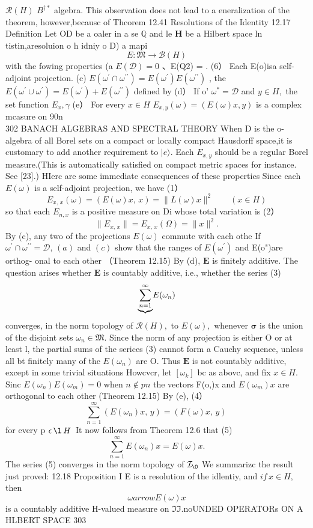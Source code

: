 ${\mathcal{R}}(H)$ $B^{\dagger*}$ algebra. This observation does not lead to a eneralization of the theorem, however,becausc of Thcorem 12.41 Resolutions of the Identity 12.17 Definition Let OD be a oaler in a se $\mathbb{Q}$ and le ${\boldsymbol{H}}$ be a Hilbert space ln tistin,aresoluion o h idniy o D) a mapi $$ E\colon\mathfrak{M}\to{\mathcal{B}}(H) $$ with the fowing properties (a $E({\mathcal{D}})=0$ 、E(Q2) = . (6） Each E(o)isa self-adjoint projection. (c) $E(\omega^{\prime}\cap\omega^{\prime\prime})=E(\omega^{\prime})E(\omega^{\prime\prime})$ , the $E(\omega^{\prime}\cup\omega^{\prime})=E(\omega^{\prime})+E(\omega^{\prime\prime})$ defined by (d） If o' $\omega^{*}={\mathcal{D}}$ and $y\in H,$ the set function $\scriptstyle{E_{x},\gamma}$ (e） For every $x\in H$ $E_{x,y}(\omega)=(E(\omega)x,y)$ is a complex mcasure on 90n$$ \qquad\qquad\qquad\qquad\qquad\qquad\qquad\qquad\qquad\qquad\qquad\qquad\qquad\qquad\qquad\qquad\qquad\qquad\qquad $$ 302 BANACH ALGEBRAS AND SPECTRAL THEORY When D is the o-algebra of all Borel sets on a compact or locally compact Hausdorff space,it is customary to add another requirement to $|e\rangle.$ Each $E_{x,y}$ should be a regular Borel measure.(This is automatically satisfied on compact metric spaces for instance. See [23].) HIerc are some immediate consequences of thesc propcrtics Since each $\scriptstyle{E(\omega)}$ is a self-adjoint projection, we have (1） $$ E_{x,\,x}(\omega)=(E(\omega)x,\,x)=\|L(\omega)x\|^{2}\qquad(x\in H) $$ so that each $E_{n,x}$ is a positive measure on Di whose total variation is (2） $$ \|E_{x,\,x}\|=E_{x,\,x}(\Omega)=\|x\|^{2}. $$ By (c), any two of the projections $\scriptstyle{E(\omega)}$ commute with each othe If $\omega^{\prime}\cap\omega^{\prime\prime}=\mathcal{D},\,(a)$ and $\left(c\right)$ show that the ranges of $E(\omega^{\prime})$ and E(o")are orthog- onal to each other （Theorem 12.15) By (d), $\boldsymbol{E}$ is finitely additive. The question arises whether $\boldsymbol{E}$ is countably additive, i.e., whether the series (3) $$ \*{\underbrace{\sum_{n=1}^{\infty}}}E(\omega_{n}) $$ converges, in the norm topology of ${\mathcal{R}}(H),$ to $E(\omega),$ whenever ${\boldsymbol{\sigma}}$ is the union of the disjoint sets $\omega_{n}\in\mathfrak{M}.$ Since the norm of any projection is either O or at least l, the partial sums of the serices (3) cannot form a Cauchy sequence, unless all bt finitely many of the $E(\omega_{n})$ are O. Thus $\boldsymbol{E}$ is not countably additive, except in some trivial situations Howcvcr, let $\scriptstyle[\omega_{k}]$ bc as abovc, and fix $x\in H.$ Sinc $E(\omega_{n})E(\omega_{m})=0$ when $n\not\in p n$ the vectors F(o,)x and $E(\omega_{m})x$ are orthogonal to each other (Theorem 12.15) By (e), (4） $$ \sum_{n=1}^{\infty}(E(\omega_{n})x,\,y)=(F(\omega)x,\,y)\, $$ for every p $\epsilon\,\l\,H\,$ It now follows from Theorem 12.6 that (5) $$ \sum_{n=1}^{\infty}E(\omega_{n})x=E(\omega)x. $$ The series (5) converges in the norm topology of ${\cal I}_{\O}$ We summarizc the result just proved: 12.18 Proposition I E is a resolution of the idlentiy, and $i f\,x\in H,$ then $$ \omega arrow E(\omega)x $$ is a countably additive H-valued measure on ${\mathfrak{I}}{\mathfrak{I}}.$noUNDED OPERATORs ON A HLBERT SPACE 303 